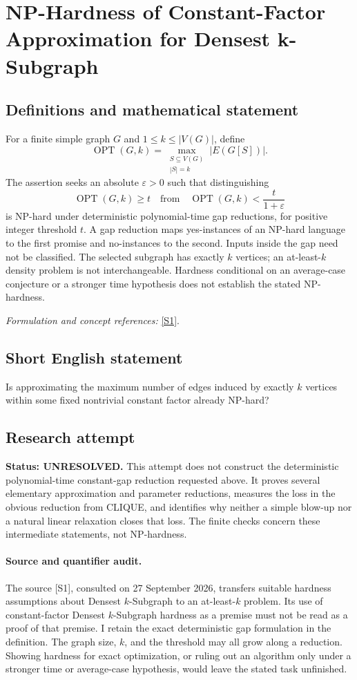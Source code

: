 \documentclass[11pt]{article}
\begin{document}
\section*{\texorpdfstring{NP-Hardness of Constant-Factor Approximation for Densest k-Subgraph}{NP-Hardness of Constant-Factor Approximation for Densest k-Subgraph}}\label{statement}
\subsection{Definitions and mathematical statement}
For a finite simple graph $G$ and $1\le k\le|V(G)|$, define
\[
 \operatorname{OPT}(G,k)=\max_{\substack{S\subseteq V(G)\\|S|=k}}|E(G[S])|.
\]
The assertion seeks an absolute ${\varepsilon}>0$ such that distinguishing
\[
 \operatorname{OPT}(G,k)\ge t
 \quad\text{from}\quad
 \operatorname{OPT}(G,k)<\frac{t}{1+{\varepsilon}}
\]
is NP-hard under deterministic polynomial-time gap reductions, for positive integer threshold $t$. A gap reduction maps yes-instances of an NP-hard language to the first promise and no-instances to the second. Inputs inside the gap need not be classified. The selected subgraph has exactly $k$ vertices; an at-least-$k$ density problem is not interchangeable. Hardness conditional on an average-case conjecture or a stronger time hypothesis does not establish the stated NP-hardness.
\par\smallskip\textit{Formulation and concept references:} \href{https://arxiv.org/html/2605.25464v1}{[S1]}.

\subsection{Short English statement}
Is approximating the maximum number of edges induced by exactly $k$ vertices within some fixed nontrivial constant factor already NP-hard?
\subsection{Research attempt}
\textbf{Status: UNRESOLVED.} This attempt does not construct the deterministic polynomial-time constant-gap reduction requested above. It proves several elementary approximation and parameter reductions, measures the loss in the obvious reduction from CLIQUE, and identifies why neither a simple blow-up nor a natural linear relaxation closes that loss. The finite checks concern these intermediate statements, not NP-hardness.

\paragraph{Source and quantifier audit.}
The source [S1], consulted on 27 September 2026, transfers suitable hardness assumptions about Densest $k$-Subgraph to an at-least-$k$ problem. Its use of constant-factor Densest $k$-Subgraph hardness as a premise must not be read as a proof of that premise. I retain the exact deterministic gap formulation in the definition. The graph size, $k$, and the threshold may all grow along a reduction. Showing hardness for exact optimization, or ruling out an algorithm only under a stronger time or average-case hypothesis, would leave the stated task unfinished.
\end{document}
